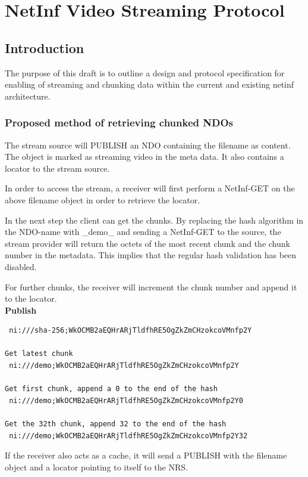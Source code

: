 \section {NetInf Video Streaming Protocol}

\subsection{Introduction}

The purpose of this draft is to outline a design and protocol specification for enabling of streaming and chunking data within the current and existing netinf architecture.

\subsubsection{Proposed method of retrieving chunked NDOs}

The stream source will PUBLISH an NDO containing the filename as content. The object is marked as streaming video in the meta data. It also contains a locator to the stream source.

In order to access the stream, a receiver will first perform a NetInf-GET on the above filename object in order to retrieve the locator. 

In the next step the client can get the chunks. By replacing the hash algorithm in the NDO-name with \_demo\_ and sending a NetInf-GET to the source, the stream provider will return the octets of the most recent chunk and the chunk number in the metadata. This implies that the regular hash validation has been disabled.

For further chunks, the receiver will increment the chunk number and append it to the locator.\\

\textbf{Publish}\\
\begin{verbatim}
 ni:///sha-256;WkOCMB2aEQHrARjTldfhRE5OgZkZmCHzokcoVMnfp2Y

Get latest chunk
 ni:///demo;WkOCMB2aEQHrARjTldfhRE5OgZkZmCHzokcoVMnfp2Y

Get first chunk, append a 0 to the end of the hash
 ni:///demo;WkOCMB2aEQHrARjTldfhRE5OgZkZmCHzokcoVMnfp2Y0

Get the 32th chunk, append 32 to the end of the hash
 ni:///demo;WkOCMB2aEQHrARjTldfhRE5OgZkZmCHzokcoVMnfp2Y32
\end{verbatim}
 
If the receiver also acts as a cache, it will send a PUBLISH with the filename object and a locator pointing to itself to the NRS.
\\

